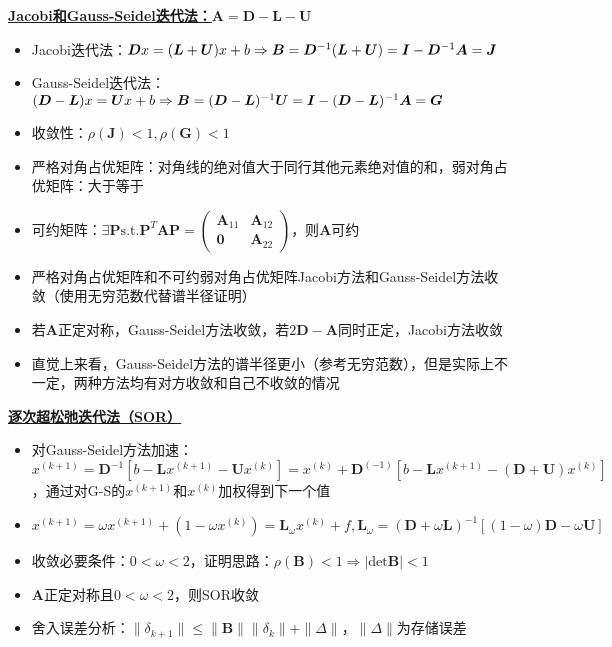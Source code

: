 \documentclass[UTF8,a4paper,landscape,compress]{paper}
\renewcommand{\subsection}[1]{{\small\textbf{\underline{#1}}}\\ }
\newcommand{\List}[1]{\begin{itemize}[fullwidth,itemindent=0em] #1 \end{itemize}}
\begin{document}
\begin{multicols}{4}
    \subsection{Jacobi和Gauss-Seidel迭代法：$\bm A = \bm D - \bm L - \bm U$}
    \List{
        \item {Jacobi迭代法：$\bm Dx = (\bm L + \bm U)x + b\Rightarrow\\\bm  B = \bm D^{-1}(\bm L + \bm U) = \bm I - \bm D^{-1}\bm A = \bm J$}
        \item {Gauss-Seidel迭代法：$(\bm D - \bm L) x = \bm U x + b \Rightarrow\\\bm  B = (\bm D - \bm L)^{-1}\bm U = \bm I - (\bm D - \bm L)^{-1}\bm A = \bm G$}
        \item {收敛性：$\rho (\bm J) <1,\rho(\bm G) <1$}
        \item {严格对角占优矩阵：对角线的绝对值大于同行其他元素绝对值的和，弱对角占优矩阵：大于等于}
        \item {可约矩阵：$\exists \bm P \mathrm{ s.t. } \bm P^T\bm A\bm P = \begin{pmatrix} \bm A_{11} & \bm A_{12} \\ \bm 0 & \bm A_{22}\end{pmatrix}$，则$\bm A$可约}
        \item {严格对角占优矩阵和不可约弱对角占优矩阵Jacobi方法和Gauss-Seidel方法收敛（使用无穷范数代替谱半径证明）}
        \item {若$\bm A$正定对称，Gauss-Seidel方法收敛，若$2\bm D - \bm A$同时正定，Jacobi方法收敛}
        \item {直觉上来看，Gauss-Seidel方法的谱半径更小（参考无穷范数），但是实际上不一定，两种方法均有对方收敛和自己不收敛的情况}
    }
    \subsection{逐次超松弛迭代法（SOR）}
    \List{
        \item {对Gauss-Seidel方法加速：$x^{(k+1)} = \bm D^{-1}[b - \bm Lx^{(k+1)} - \bm Ux^{(k)}] = x^{(k)} + \bm D^{(-1)}[b - \bm Lx^{(k+1)} - (\bm D + \bm U)x^{(k)}]$，通过对G-S的$x^{(k+1)}$和$x^{(k)}$加权得到下一个值}
        \item {$x^{(k+1)} = \omega x^{(k+1)} + (1 - \omega x^{(k)}) = \bm L_\omega x^{(k)} + f, \bm L_\omega = (\bm D + \omega \bm L)^{-1}[(1-\omega)\bm D -\omega \bm U]$}
        \item {收敛必要条件：$0 < \omega < 2$，证明思路：$\rho(\bm B) < 1 \Rightarrow |\mathrm{det}\bm B| < 1$}
        \item {$\bm A$正定对称且$0 < \omega < 2$，则SOR收敛}
        \item {舍入误差分析：$\|\delta_{k+1}\| \le \|\bm B\| \|\delta_k\| + \|\Delta\|$，$\|\Delta\|$为存储误差}
    }

\end{multicols}
\end{document}
